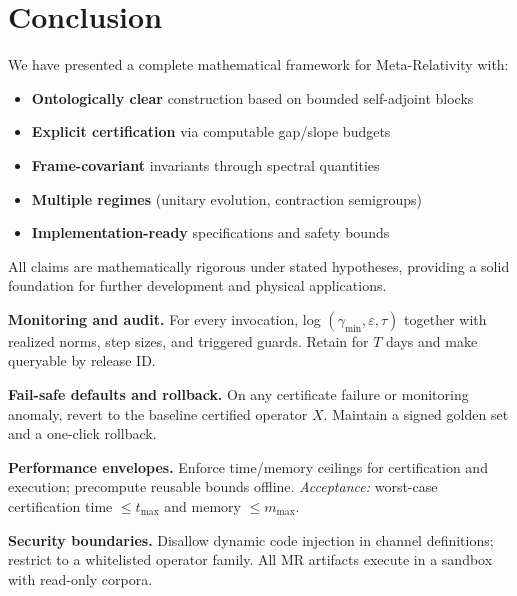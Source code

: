\documentclass[10pt]{article}
\begin{document}
\section{Conclusion}

We have presented a complete mathematical framework for Meta-Relativity with:
\begin{itemize}
    \item \textbf{Ontologically clear} construction based on bounded self-adjoint blocks
    \item \textbf{Explicit certification} via computable gap/slope budgets  
    \item \textbf{Frame-covariant} invariants through spectral quantities
    \item \textbf{Multiple regimes} (unitary evolution, contraction semigroups)
    \item \textbf{Implementation-ready} specifications and safety bounds
\end{itemize}

All claims are mathematically rigorous under stated hypotheses, providing a solid foundation for further development and physical applications.

\appendix


\item \textbf{Monitoring and audit.}\label{g:audit}
For every invocation, log \((\gamma_{\min}, \varepsilon, \tau)\) together with realized norms, step sizes, and triggered guards. Retain for \(T\) days and make queryable by release ID.


\item \textbf{Fail-safe defaults and rollback.}\label{g:rollback}
On any certificate failure or monitoring anomaly, revert to the baseline certified operator \(X\). Maintain a signed golden set and a one-click rollback.


\item \textbf{Performance envelopes.}\label{g:perf}
Enforce time/memory ceilings for certification and execution; precompute reusable bounds offline.
\emph{Acceptance:} worst-case certification time \(\le t_{\max}\) and memory \(\le m_{\max}\).


\item \textbf{Security boundaries.}\label{g:sec}
Disallow dynamic code injection in channel definitions; restrict to a whitelisted operator family. All MR artifacts execute in a sandbox with read-only corpora.
\end{document}
